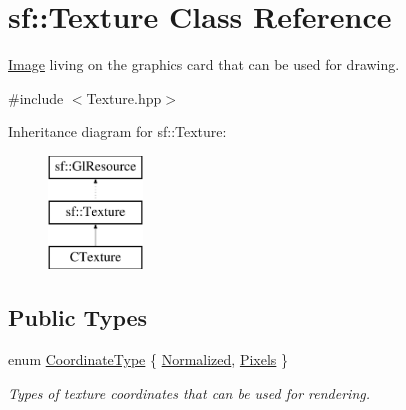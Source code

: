 \hypertarget{classsf_1_1Texture}{\section{sf\-:\-:Texture Class Reference}
\label{classsf_1_1Texture}
}


\hyperlink{classsf_1_1Image}{Image} living on the graphics card that can be used for drawing.  




{\ttfamily \#include $<$Texture.\-hpp$>$}

Inheritance diagram for sf\-:\-:Texture\-:\begin{figure}[H]
\begin{center}
\leavevmode
\includegraphics[height=3.000000cm]{classsf_1_1Texture}
\end{center}
\end{figure}
\subsection*{Public Types}
\begin{DoxyCompactItemize}
\item 
enum \hyperlink{classsf_1_1Texture_aa6fd3bbe3c334b3c4428edfb2765a82e}{Coordinate\-Type} \{ \hyperlink{classsf_1_1Texture_aa6fd3bbe3c334b3c4428edfb2765a82ea69d6228950882e4d68be4ba4dbe7df73}{Normalized}, 
\hyperlink{classsf_1_1Texture_aa6fd3bbe3c334b3c4428edfb2765a82ea6372f9c3a10203a7a69d8d5da59d82ff}{Pixels}
 \}
\begin{DoxyCompactList}\small\item\em Types of texture coordinates that can be used for rendering. \end{DoxyCompactList}\end{DoxyCompactItemize}
